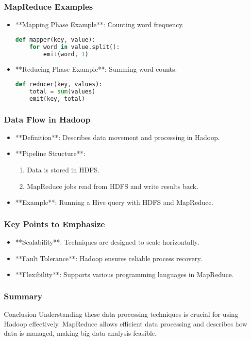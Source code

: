 \documentclass[aspectratio=169]{beamer}
\begin{document}
\begin{frame}[fragile]
    \frametitle{MapReduce Examples}
    \begin{itemize}
        \item **Mapping Phase Example**: Counting word frequency.
        \begin{lstlisting}[language=Python]
def mapper(key, value):
    for word in value.split():
        emit(word, 1)
        \end{lstlisting}
        \item **Reducing Phase Example**: Summing word counts.
        \begin{lstlisting}[language=Python]
def reducer(key, values):
    total = sum(values)
    emit(key, total)
        \end{lstlisting}
    \end{itemize}
\end{frame}

\begin{frame}
    \frametitle{Data Flow in Hadoop}
    \begin{itemize}
        \item **Definition**: Describes data movement and processing in Hadoop.
        \item **Pipeline Structure**:
        \begin{enumerate}
            \item Data is stored in HDFS.
            \item MapReduce jobs read from HDFS and write results back.
        \end{enumerate}
        \item **Example**: Running a Hive query with HDFS and MapReduce.
    \end{itemize}
\end{frame}

\begin{frame}
    \frametitle{Key Points to Emphasize}
    \begin{itemize}
        \item **Scalability**: Techniques are designed to scale horizontally.
        \item **Fault Tolerance**: Hadoop ensures reliable process recovery.
        \item **Flexibility**: Supports various programming languages in MapReduce.
    \end{itemize}
\end{frame}

\begin{frame}
    \frametitle{Summary}
    \begin{block}{Conclusion}
        Understanding these data processing techniques is crucial for using Hadoop effectively. MapReduce allows efficient data processing and describes how data is managed, making big data analysis feasible.
    \end{block}
\end{frame}
\end{document}
